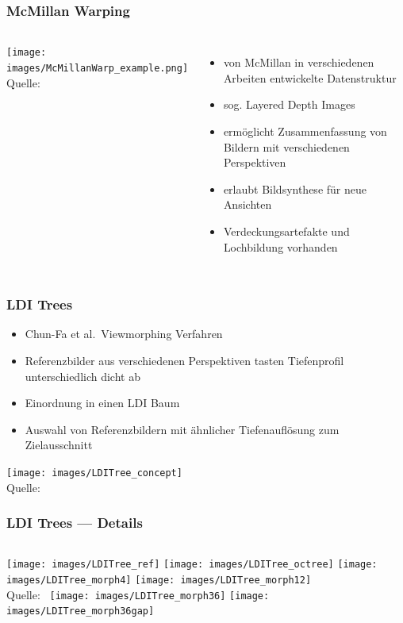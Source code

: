 \documentclass[aspectratio=169]{beamer}
\begin{document}
\begin{frame}
    \frametitle{McMillan Warping}
    \begin{columns}
    \texttt{[image: images/McMillanWarp\_example.png]}
    \centering
    \\[-1ex]{\tiny Quelle:~\cite{mcmillan2009image}}

        \begin{itemize}
            \item von McMillan in verschiedenen Arbeiten entwickelte Datenstruktur
            \item sog. Layered Depth Images
            \item ermöglicht Zusammenfassung von Bildern mit verschiedenen Perspektiven
            \item erlaubt Bildsynthese für neue Ansichten
            \item Verdeckungsartefakte und Lochbildung vorhanden
        \end{itemize}
    \end{columns}
\end{frame}

\begin{frame}
    \frametitle{LDI Trees}
    \begin{itemize}
        \item Chun-Fa et al.\ Viewmorphing Verfahren
        \item Referenzbilder aus verschiedenen Perspektiven tasten Tiefenprofil unterschiedlich dicht ab
        \item Einordnung in einen LDI Baum
        \item Auswahl von Referenzbildern mit ähnlicher Tiefenauflösung zum Zielausschnitt
    \end{itemize}
    \texttt{[image: images/LDITree\_concept]}
    \centering
    \\[-1ex]{\tiny Quelle:~\cite{chang1999ldi}}
\end{frame}

\begin{frame}
    \frametitle{LDI Trees --- Details}
    \begin{columns}
        \centering
        \texttt{[image: images/LDITree\_ref]}
        \texttt{[image: images/LDITree\_octree]}
        \centering
        \texttt{[image: images/LDITree\_morph4]}
        \texttt{[image: images/LDITree\_morph12]}
        \centering
        \\[-1ex]{\tiny Quelle:~\cite{chang1999ldi}}
        \centering
        \texttt{[image: images/LDITree\_morph36]}
        \texttt{[image: images/LDITree\_morph36gap]}
    \end{columns}
\end{frame}
\end{document}
